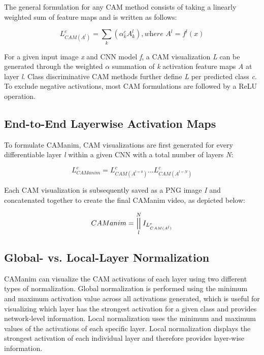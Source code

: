 \documentclass[10pt, conference, compsocconf]{IEEEtran}
\DeclareMathOperator*{\concat}{\scalerel*{\Vert}{\sum}}
\begin{document}
The general formulation for any CAM method consists of taking a linearly weighted sum of feature maps and is written as follows: 

\begin{equation}\label{eqn:cam-form}
L^c_{CAM(A^l)} = \sum\limits_{k}(\alpha_k^cA_k^l),  \textit{where }  A^l= f ^l(x)
\end{equation}

For a given input image \textit{x} and CNN model \textit{f}, a CAM visualization \textit{L} can be generated through the weighted \(\alpha\) summation of \textit{k} activation feature maps \textit{A} at layer \textit{l}. Class discriminative CAM methods further define \textit{L} per predicted class \textit{c}. To exclude negative activations, most CAM formulations are followed by a ReLU operation.


\subsection{End-to-End Layerwise Activation Maps}

To formulate CAManim, CAM visualizations are first generated for every differentiable layer \textit{l} within a given CNN with a total number of layers \textit{N}:

\begin{equation}\label{eqn:cam-form}
L^c_{CAManim} = L^c_{CAM(A^{l=0})} ... L^c_{CAM(A^{l=N})}
\end{equation}

Each CAM visualization is subsequently saved as a PNG image \textit{I} and concatenated together to create the final CAManim video, as depicted below:

\begin{equation}\label{eqn:cam-form}
CAManim = \concat_{l}^{N}I_{L^c_{CAM(A^{l})}} 
\end{equation}


\subsection{Global- vs. Local-Layer Normalization}

CAManim can visualize the CAM activations of each layer using two different types of normalization. 
Global normalization is performed using the minimum and maximum activation value across all activations generated, which is useful for visualizing which layer has the strongest activation for a given class and provides network-level information. Local normalization uses the minimum and maximum values of the activations of each specific layer. Local normalization displays the strongest activation of each individual layer and therefore provides layer-wise information.
\end{document}
